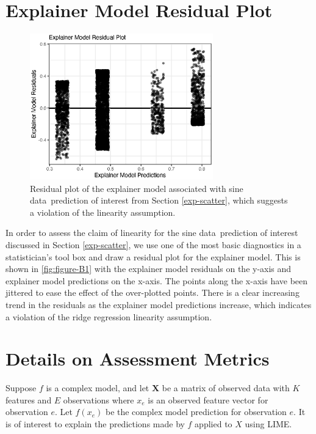 \documentclass[AMS,STIX2COL]{WileyNJD-v2}\usepackage[]{graphicx}\usepackage[]{color}
\newenvironment{knitrout}{}{} %
\newcommand{\data}{sine data}
\begin{document}
\section{Explainer Model Residual Plot} \label{residual-plot}
\begin{figure}[!h]
\begin{knitrout}
\color{fgcolor}

{\centering \includegraphics[width=3.125in]{figure-B1-1} 

}



\end{knitrout}
\caption{Residual plot of the explainer model associated with \data \ prediction of interest from Section \ref{exp-scatter}, which suggests a violation of the linearity assumption.}
\label{fig:figure-B1}
\end{figure}

In order to assess the claim of linearity for the \data \ prediction of interest discussed in Section \ref{exp-scatter}, we use one of the most basic diagnostics in a statistician's tool box and draw a residual plot for the explainer model. This is shown in \autoref{fig:figure-B1} with the explainer model residuals on the y-axis and explainer model predictions on the x-axis. The points along the x-axis have been jittered to ease the effect of the over-plotted points. There is a clear increasing trend in the residuals as the explainer model predictions increase, which indicates a violation of the ridge regression linearity assumption.

\section{Details on Assessment Metrics} \label{metric-details}

Suppose $f$ is a complex model, and let $\textbf{X}$ be a matrix of observed data with $K$ features and $E$ observations where $x_e$ is an observed feature vector for observation $e$. Let $f(x_e)$ be the complex model prediction for observation $e$. It is of interest to explain the predictions made by $f$ applied to $X$ using LIME. 
\end{document}
